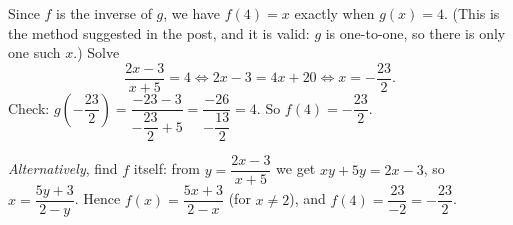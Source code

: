 Since $f$ is the inverse of $g$, we have $f(4)=x$ exactly when $g(x)=4$. (This is the method suggested in the post, and it is valid: $g$ is one-to-one, so there is only one such $x$.) Solve
\[\dfrac{2x-3}{x+5}=4\iff 2x-3=4x+20\iff x=-\dfrac{23}{2}.\]
Check: $g\left(-\dfrac{23}{2}\right)=\dfrac{-23-3}{-\dfrac{23}{2}+5}=\dfrac{-26}{-\dfrac{13}{2}}=4$. So $f(4)=\boxed{-\dfrac{23}{2}}$.

\emph{Alternatively}, find $f$ itself: from $y=\dfrac{2x-3}{x+5}$ we get $xy+5y=2x-3$, so $x=\dfrac{5y+3}{2-y}$. Hence $f(x)=\dfrac{5x+3}{2-x}$ (for $x\ne2$), and $f(4)=\dfrac{23}{-2}=-\dfrac{23}{2}$.
